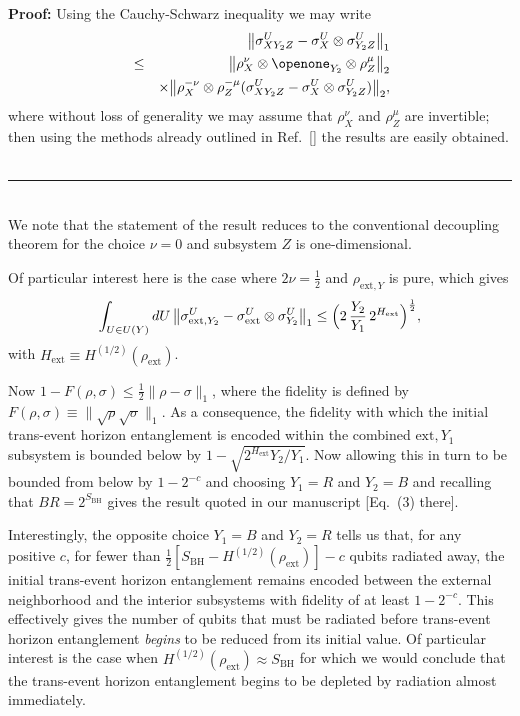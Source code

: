 \documentclass[aps,showpacs,prl,12pt]{revtex4}
\begin{document}
\noindent
{\bf Proof:}
Using the Cauchy-Schwarz inequality we may write
\begin{eqnarray}
&&\bigl\| \sigma_{XY_2Z}^U-
\sigma_{X}^U\otimes \sigma_{Y_2Z}^U\bigr\|_1 \\
&\le& \bigl\| \rho_{X}^{\nu}\otimes\openone_{Y_2}^{\text{~}}\otimes
\rho_{Z}^{\mu} \bigr\|_2\nonumber\\
&&\times
\bigl\| \rho_{X}^{-\nu}\otimes \rho_{Z}^{-\mu}(\sigma_{XY_2Z}^U-
\sigma_{X}^U\otimes \sigma_{Y_2Z}^U)\bigr\|_2, \nonumber
\end{eqnarray}
where without loss of generality we may assume that $\rho_{X}^{\nu}$
and $\rho_{Z}^{\mu}$ are invertible; then using the methods already
outlined in Ref.~[] the results are easily obtained.
{$~$}\hfill \rule{2mm}{2mm}\\
We note that the statement of the result reduces to the conventional
decoupling theorem for the choice $\nu=0$ and subsystem $Z$ is
one-dimensional.

Of particular interest here is the case where $2\nu=\frac{1}{2}$ and
$\rho_{\text{ext},Y}$ is pure, which gives
\begin{equation}
\int_{U\in U(Y)}dU\,\bigl\| \sigma_{\text{ext},Y_2}^U-
\sigma_{\text{ext}}^U\otimes \sigma_{Y_2}^U\bigr\|_1
\le \Bigl(2\,\frac{Y_2}{Y_1}\,2^{H_{\text{ext}}}\Bigr)^{\frac{1}{2}},
\end{equation}
with $H_{\text{ext}}\equiv H^{(1/2)}(\rho_{\text{ext}})$.

Now $1-F(\rho,\sigma) \le \frac{1}{2}\|\rho-\sigma\|_1$, where the fidelity
is defined by $F(\rho,\sigma)\equiv \|\sqrt{\rho}\sqrt{\sigma}\|_1$.
As a consequence, the fidelity with which the initial trans-event
horizon entanglement is encoded within the combined $\text{ext},Y_1$
subsystem is bounded below by $1-\sqrt{2^{H_{\text{ext}}} Y_2/Y_1}$.
Now allowing this in turn to be bounded from below by $1-2^{-c}$ and
choosing $Y_1=R$ and $Y_2=B$ and recalling that $BR=2^{S_{\text{BH}}}$
gives the result quoted in our manuscript [Eq.~(3) there].

Interestingly, the opposite choice $Y_1=B$ and $Y_2=R$ tells us that,
for any positive $c$, for fewer than
$\frac{1}{2}[S_{\text{BH}}-H^{(1/2)}(\rho_{\text{ext}})]-c$
qubits radiated away, the initial trans-event horizon entanglement
remains encoded between the external neighborhood and the interior
subsystems with fidelity of at least $1-2^{-c}$. This effectively
gives the number of qubits that must be radiated before trans-event
horizon entanglement {\it begins\/} to be reduced from its initial
value. Of particular interest is the case when
$H^{(1/2)}(\rho_{\text{ext}})\approx S_{\text{BH}}$ for which we would
conclude that the trans-event horizon entanglement begins to be
depleted by radiation almost immediately.
\end{document}
